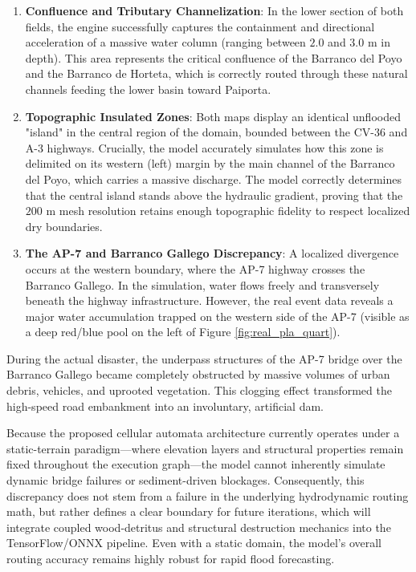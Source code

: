 \begin{enumerate}[label=\Alph*.]
    \item \textbf{Confluence and Tributary Channelization}: In the lower section of both fields, the engine successfully captures the 
    containment and directional acceleration of a massive water column (ranging between $2.0$ and $3.0\text{ m}$ in depth). This area 
    represents the critical confluence of the Barranco del Poyo and the Barranco de Horteta, which is correctly routed through these 
    natural channels feeding the lower basin toward Paiporta.
    
    \item \textbf{Topographic Insulated Zones}: Both maps display an identical unflooded "island" in the central region of the domain, 
    bounded between the CV-36 and A-3 highways. Crucially, the model accurately simulates how this zone is delimited on its western (left) 
    margin by the main channel of the Barranco del Poyo, which carries a massive discharge. The model correctly determines that the central 
    island stands above the hydraulic gradient, proving that the $200\text{ m}$ mesh resolution retains enough topographic fidelity to 
    respect localized dry boundaries.
    
    \item \textbf{The AP-7 and Barranco Gallego Discrepancy}: A localized divergence occurs at the western boundary, where the AP-7 highway 
    crosses the Barranco Gallego. In the simulation, water flows freely and transversely beneath the highway infrastructure. However, the 
    real event data reveals a major water accumulation trapped on the western side of the AP-7 (visible as a deep red/blue pool on the left 
    of Figure \ref{fig:real_pla_quart}).
\end{enumerate}

During the actual disaster, the underpass structures of the AP-7 bridge over the Barranco Gallego became completely obstructed by massive 
volumes of urban debris, vehicles, and uprooted vegetation. This clogging effect transformed the high-speed road embankment into an 
involuntary, artificial dam. 

Because the proposed cellular automata architecture currently operates under a static-terrain paradigm—where elevation layers and structural 
properties remain fixed throughout the execution graph—the model cannot inherently simulate dynamic bridge failures or sediment-driven 
blockages. Consequently, this discrepancy does not stem from a failure in the underlying hydrodynamic routing math, but rather defines a 
clear boundary for future iterations, which will integrate coupled wood-detritus and structural destruction mechanics into the 
TensorFlow/ONNX pipeline. Even with a static domain, the model's overall routing accuracy remains highly robust for rapid flood forecasting.


